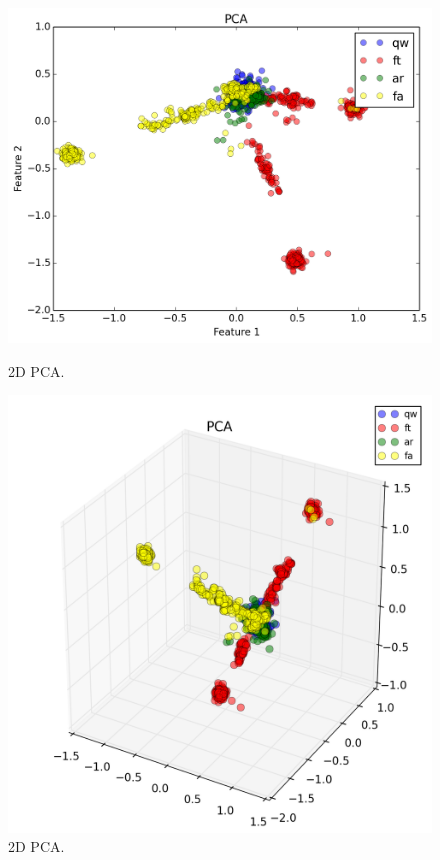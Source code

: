 \begin{figure}
\centering
\begin{minipage}{.23\textwidth}
\includegraphics[width=1\textwidth]{img/pca_2d}
\caption{2D PCA.}
\label{fig:2d_pca}
\end{minipage}
\begin{minipage}{.23\textwidth}
\includegraphics[width=1\textwidth]{img/pca_3d}
\caption{2D PCA.}
\label{fig:3d_pca}
\end{minipage}
\end{figure}